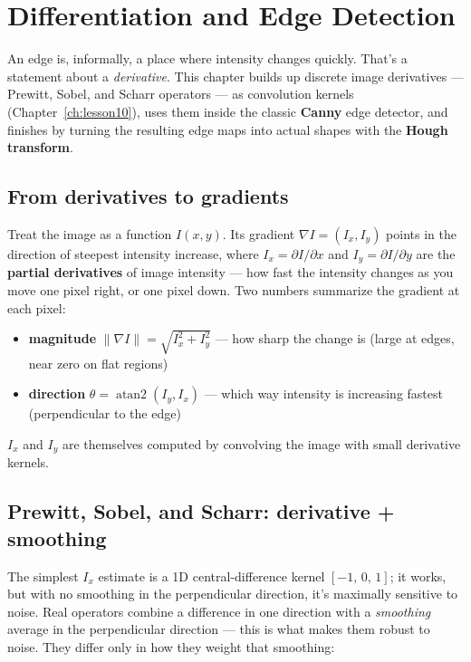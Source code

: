 \chapter{Differentiation and Edge Detection}
\label{ch:lesson12}

An edge is, informally, a place where intensity changes quickly. That's a statement about a \emph{derivative}. This chapter builds up discrete image derivatives --- Prewitt, Sobel, and Scharr operators --- as convolution kernels (Chapter~\ref{ch:lesson10}), uses them inside the classic \textbf{Canny} edge detector, and finishes by turning the resulting edge maps into actual shapes with the \textbf{Hough transform}.

\section{From derivatives to gradients}

Treat the image as a function $I(x,y)$. Its gradient $\nabla I=(I_x,I_y)$ points in the direction of steepest intensity increase, where $I_x=\partial I/\partial x$ and $I_y=\partial I/\partial y$ are the \textbf{partial derivatives} of image intensity --- how fast the intensity changes as you move one pixel right, or one pixel down. Two numbers summarize the gradient at each pixel:
\begin{itemize}
  \item \textbf{magnitude} $\|\nabla I\| = \sqrt{I_x^2+I_y^2}$ --- how sharp the change is (large at edges, near zero on flat regions)
  \item \textbf{direction} $\theta = \operatorname{atan2}(I_y,I_x)$ --- which way intensity is increasing fastest (perpendicular to the edge)
\end{itemize}
$I_x$ and $I_y$ are themselves computed by convolving the image with small derivative kernels.

\section{Prewitt, Sobel, and Scharr: derivative + smoothing}

The simplest $I_x$ estimate is a 1D central-difference kernel $[-1,\,0,\,1]$; it works, but with no smoothing in the perpendicular direction, it's maximally sensitive to noise. Real operators combine a difference in one direction with a \emph{smoothing} average in the perpendicular direction --- this is what makes them robust to noise. They differ only in how they weight that smoothing:

